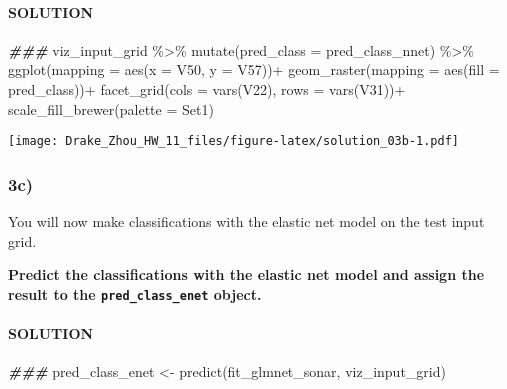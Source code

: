\documentclass[
]{article}
\newenvironment{Shaded}{\begin{snugshade}}{\end{snugshade}}
\newcommand{\AttributeTok}[1]{\textcolor[rgb]{0.77,0.63,0.00}{#1}}
\newcommand{\DocumentationTok}[1]{\textcolor[rgb]{0.56,0.35,0.01}{\textbf{\textit{#1}}}}
\newcommand{\FunctionTok}[1]{\textcolor[rgb]{0.00,0.00,0.00}{#1}}
\newcommand{\NormalTok}[1]{#1}
\newcommand{\OtherTok}[1]{\textcolor[rgb]{0.56,0.35,0.01}{#1}}
\newcommand{\SpecialCharTok}[1]{\textcolor[rgb]{0.00,0.00,0.00}{#1}}
\newcommand{\StringTok}[1]{\textcolor[rgb]{0.31,0.60,0.02}{#1}}
\begin{document}
\hypertarget{solution-12}{%
\paragraph{SOLUTION}\label{solution-12}}

\begin{Shaded}
\begin{Highlighting}[]
\DocumentationTok{\#\#\#}
\NormalTok{viz\_input\_grid }\SpecialCharTok{\%\textgreater{}\%}
  \FunctionTok{mutate}\NormalTok{(}\AttributeTok{pred\_class =}\NormalTok{ pred\_class\_nnet) }\SpecialCharTok{\%\textgreater{}\%}
  \FunctionTok{ggplot}\NormalTok{(}\AttributeTok{mapping =} \FunctionTok{aes}\NormalTok{(}\AttributeTok{x =}\NormalTok{ V50, }\AttributeTok{y =}\NormalTok{ V57))}\SpecialCharTok{+}
  \FunctionTok{geom\_raster}\NormalTok{(}\AttributeTok{mapping =} \FunctionTok{aes}\NormalTok{(}\AttributeTok{fill =}\NormalTok{ pred\_class))}\SpecialCharTok{+}
  \FunctionTok{facet\_grid}\NormalTok{(}\AttributeTok{cols =} \FunctionTok{vars}\NormalTok{(V22), }\AttributeTok{rows =} \FunctionTok{vars}\NormalTok{(V31))}\SpecialCharTok{+}
  \FunctionTok{scale\_fill\_brewer}\NormalTok{(}\AttributeTok{palette =} \StringTok{\textquotesingle{}Set1\textquotesingle{}}\NormalTok{)}
\end{Highlighting}
\end{Shaded}

\texttt{[image: Drake\_Zhou\_HW\_11\_files/figure-latex/solution\_03b-1.pdf]}

\hypertarget{c-2}{%
\subsubsection{3c)}\label{c-2}}

You will now make classifications with the elastic net model on the test
input grid.

\textbf{Predict the classifications with the elastic net model and
assign the result to the \texttt{pred\_class\_enet} object.}

\hypertarget{solution-13}{%
\paragraph{SOLUTION}\label{solution-13}}

\begin{Shaded}
\begin{Highlighting}[]
\DocumentationTok{\#\#\#}
\NormalTok{pred\_class\_enet }\OtherTok{\textless{}{-}} \FunctionTok{predict}\NormalTok{(fit\_glmnet\_sonar, viz\_input\_grid)}
\end{Highlighting}
\end{Shaded}
\end{document}
